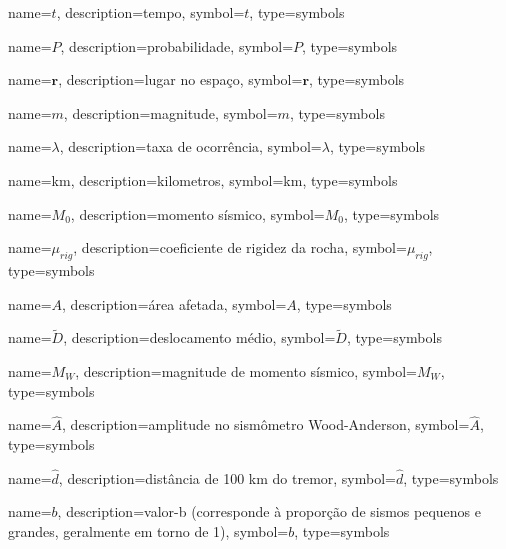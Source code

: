
{
	name={\ensuremath{t}},
	description={tempo},
	symbol={\ensuremath{t}},
	type=symbols
}

{
	name={\ensuremath{P}},
	description={probabilidade},
	symbol={\ensuremath{P}},
	type=symbols
}


{
	name={\ensuremath{\boldsymbol{r}}},
	description={lugar no espaço},
	symbol={\ensuremath{\boldsymbol{r}}},
	type=symbols
}


{
	name={\ensuremath{m}},
	description={magnitude},
	symbol={\ensuremath{m}},
	type=symbols
}


{
	name={\ensuremath{\lambda}},
	description={taxa de ocorrência},
	symbol={\ensuremath{\lambda}},
	type=symbols
}

{
	name={km},
	description={kilometros},
	symbol={km},
	type=symbols
}


{
	name={\ensuremath{M_0}},
	description={momento sísmico},
	symbol={\ensuremath{M_0}},
	type=symbols
}


{
	name={\ensuremath{\mu_{rig}}},
	description={coeficiente de rigidez da rocha},
	symbol={\ensuremath{\mu_{rig}}},
	type=symbols
}


{
	name={\ensuremath{A}},
	description={área afetada},
	symbol={\ensuremath{A}},
	type=symbols
}


{
	name={\ensuremath{\tilde{D}}},
	description={deslocamento médio},
	symbol={\ensuremath{\tilde{D}}},
	type=symbols
}


{
	name={\ensuremath{M_W}},
	description={magnitude de momento sísmico},
	symbol={\ensuremath{M_W}},
	type=symbols
}

{
	name={\ensuremath{\hat{A}}},
	description={amplitude no sismômetro Wood-Anderson},
	symbol={\ensuremath{\hat{A}}},
	type=symbols
}

{
	name={\ensuremath{\hat{d}}},
	description={distância de 100 km do tremor},
	symbol={\ensuremath{\hat{d}}},
	type=symbols
}


{
	name={\ensuremath{b}},
	description={valor-b (corresponde à proporção de sismos pequenos e grandes, geralmente em torno de 1)},
	symbol={\ensuremath{b}},
	type=symbols
}


